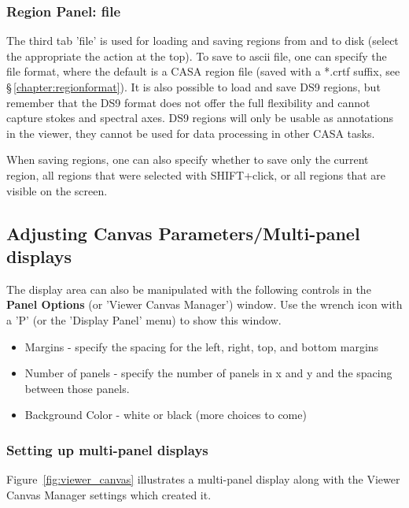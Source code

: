 \subsubsection{Region Panel: file}
\label{section:display.image.rgnmgr.file}

The third tab 'file' is used for loading and saving regions from and
to disk (select the appropriate the action at the top). To save to
ascii file, one can specify the file format, where the default is a
CASA region file (saved with a *.crtf suffix, see
\S\,\ref{chapter:regionformat}). It is also possible to load and save
DS9 regions, but remember that the DS9 format does not offer the full
flexibility and cannot capture stokes and spectral axes. DS9 regions
will only be usable as annotations in the viewer, they cannot be used
for data processing in other CASA tasks.

When saving regions, one can also specify whether to save only the
current region, all regions that were selected with
SHIFT+click, or all regions that are visible on the screen. 


\subsection{Adjusting Canvas Parameters/Multi-panel displays}
\label{section:display.viewerGUI.canvas}

The display area can also be manipulated with the following controls in
the {\bf Panel Options} (or 'Viewer Canvas Manager') window.
Use the wrench icon with a 'P' (or the 'Display Panel' menu) to show this
window.
\begin{itemize}
   \item Margins - specify the spacing for the left, right, top, and bottom margins
   \item Number of panels - specify the number of panels in x and y
         and the spacing between those panels.
   \item Background Color - white or black (more choices to come)
\end{itemize}

\subsubsection{Setting up multi-panel displays}
\label{section:display.viewerGUI.canvas.multi}

Figure~\ref{fig:viewer_canvas} illustrates a multi-panel display along
with the Viewer Canvas Manager settings which created it. 


